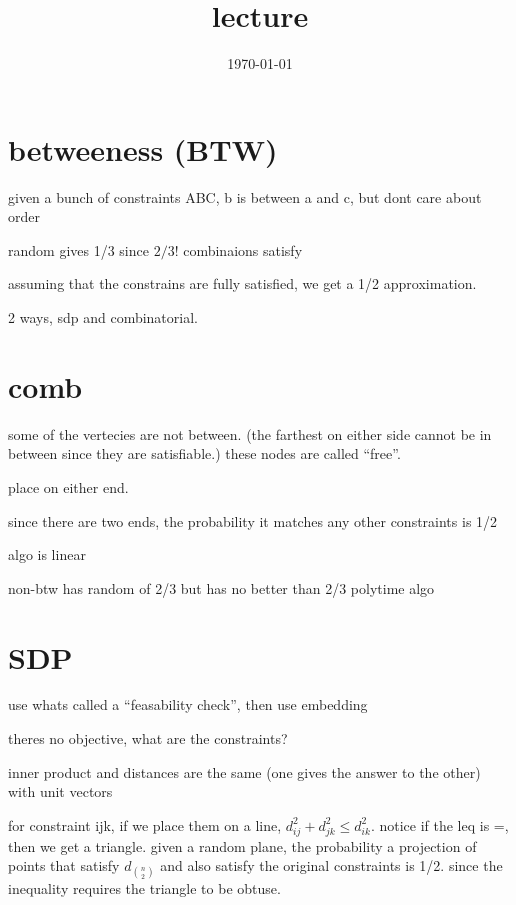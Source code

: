 \documentclass{article}
\title{lecture}
\date{\today}
\theoremstyle{definition}
\begin{document}
\maketitle

\section{betweeness (BTW)}
given a bunch of constraints ABC, b is between a and c, but dont care about order

random gives 1/3 since \(2/3!\) combinaions satisfy

assuming that the constrains are fully satisfied, we get a 1/2 approximation.


2 ways, sdp and combinatorial. 

\section{comb}

some of the vertecies are not between. (the farthest on either side cannot be in between since they are satisfiable.) these nodes are called ``free''.

place on either end. 

since there are two ends, the probability it matches any other constraints is 1/2

algo is linear

non-btw has random of 2/3 but has no better than 2/3 polytime algo

\section{SDP}


use whats called a ``feasability check'', then use embedding


theres no objective, what are the constraints?

inner product and distances are the same (one gives the answer to the other) with unit vectors

for constraint ijk, if we place them on a line, \(d_{ij}^2+d_{jk}^2\leq d_{ik}^2\). notice if the leq is =, then we get a triangle. given a random plane, the probability a projection of points that satisfy \(d_{n\choose 2}\) and also satisfy the original constraints is 1/2. since the inequality requires the triangle to be obtuse. 
\end{document}
